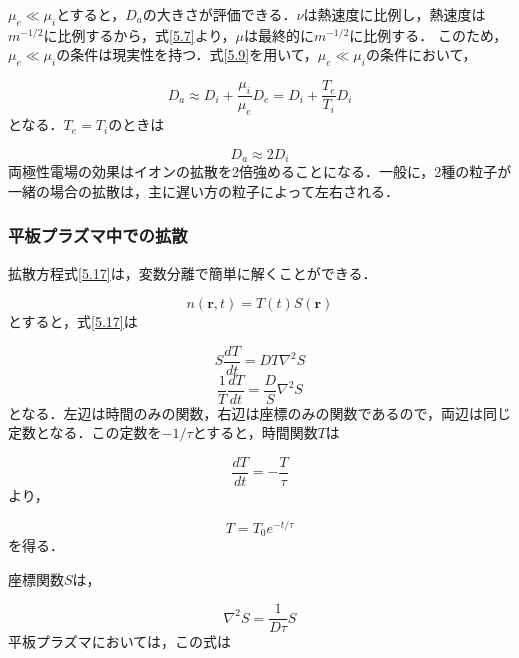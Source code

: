 \documentclass{ltjsarticle}
\numberwithin{equation}{section} %
\begin{document}
$\mu_e \ll \mu_i$とすると，$D_a$の大きさが評価できる．$\nu$は熱速度に比例し，熱速度は$m^{-1/2}$に比例するから，式\eqref{5.7}より，$\mu$は最終的に$m^{-1/2}$に比例する．
このため，$\mu_e \ll \mu_i$の条件は現実性を持つ．式\eqref{5.9}を用いて，$\mu_e \ll \mu_i$の条件において，

\begin{equation}
  D_a \approx D_i + \frac{\mu_i}{\mu_e}D_e = D_i + \frac{T_e}{T_i}D_i \label{5.18} 
\end{equation}
となる．$T_e=T_i$のときは

\begin{equation}
  D_a \approx 2D_i \label{5.19}
\end{equation}
両極性電場の効果はイオンの拡散を2倍強めることになる．一般に，2種の粒子が一緒の場合の拡散は，主に遅い方の粒子によって左右される．


\subsubsection{平板プラズマ中での拡散} \label{section5.2.2}
拡散方程式\eqref{5.17}は，変数分離で簡単に解くことができる．

\begin{equation}
  n(\bm{r},t) = T(t)S(\bm{r}) \label{5.20}
\end{equation}
とすると，式\eqref{5.17}は

\begin{equation}
  S\frac{dT}{dt} = DT\nabla^2 S \label{5.21}
\end{equation}
\begin{equation}
  \frac{1}{T}\frac{dT}{dt} = \frac{D}{S}\nabla^2 S \label{5.22}
\end{equation}
となる．左辺は時間のみの関数，右辺は座標のみの関数であるので，両辺は同じ定数となる．この定数を$-1/\tau$とすると，時間関数$T$は

\begin{equation}
  \frac{dT}{dt} = -\frac{T}{\tau} \label{5.23}
\end{equation}
より，

\begin{equation}
  T = T_0e^{-t/\tau} \label{5.24}
\end{equation}
を得る．

座標関数$S$は，

\begin{equation}
  \nabla^2 S = \frac{1}{D\tau}S \label{5.25}
\end{equation}
平板プラズマにおいては，この式は
\end{document}
